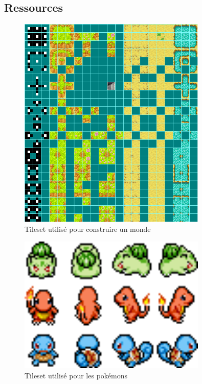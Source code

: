 \documentclass[a4paper,12pt]{article}
\begin{document}
    \subsection{Ressources}
    \begin{figure}[ht]
    \begin{center}
        \includegraphics[width=0.8\textwidth]{tilemap.png}
    \end{center}
    \caption{Tileset utilisé pour construire un monde}
    \end{figure}
    
    \begin{figure}[ht]
    \begin{center}
        \includegraphics[width=0.8\textwidth]{pokemonLatex.png}
    \end{center}
    \caption{Tileset utilisé pour les pokémons}
    \end{figure}
\end{document}
